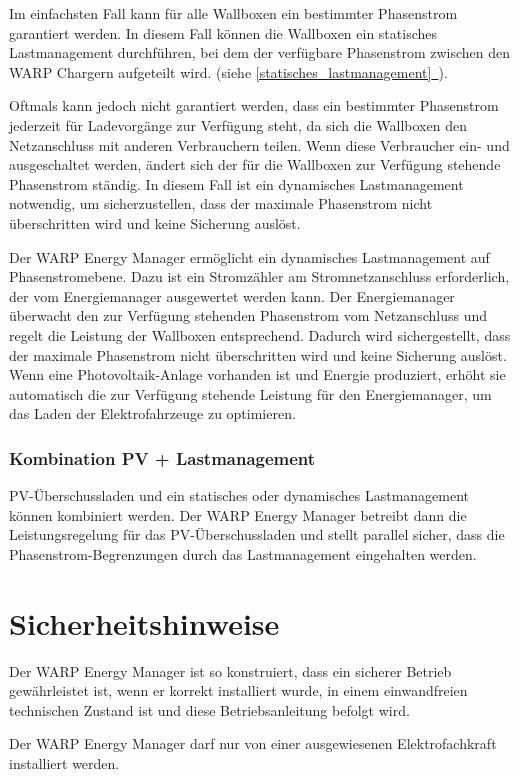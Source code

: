 \documentclass[a4paper,10pt]{article}
\newcommand{\hint}[1]{\begin{tcolorbox}[colback=boxgray,colframe=black,coltext=
white,title=Hinweis,left*=2mm,right*=2mm,boxsep=1mm,bottom=1mm,top=1mm]#1\end{tcolorbox}}
\newcommand*{\fullref}[1]{\hyperref[{#1}]{\ref*{#1}~\nameref*{#1}}}
\begin{document}
\begin{multicols*}{2}
	Im einfachsten Fall kann für alle Wallboxen ein bestimmter Phasenstrom garantiert werden.
	In diesem Fall können die Wallboxen ein statisches Lastmanagement durchführen,
	bei dem der verfügbare Phasenstrom zwischen den WARP Chargern aufgeteilt wird. (siehe \fullref{statisches_lastmanagement}).

	Oftmals kann jedoch nicht garantiert werden, dass ein bestimmter Phasenstrom jederzeit
	für Ladevorgänge zur Verfügung steht, da sich die Wallboxen den Netzanschluss mit anderen Verbrauchern teilen.
	Wenn diese Verbraucher ein- und ausgeschaltet werden,
	ändert sich der für die Wallboxen zur Verfügung stehende Phasenstrom
	ständig. In diesem Fall ist ein dynamisches Lastmanagement notwendig, um
	sicherzustellen, dass der maximale Phasenstrom nicht überschritten wird und
	keine Sicherung auslöst.

	Der WARP Energy Manager ermöglicht ein dynamisches Lastmanagement auf Phasenstromebene.
	Dazu ist ein Stromzähler am Stromnetzanschluss erforderlich, der vom Energiemanager
	ausgewertet werden kann. Der Energiemanager überwacht den zur Verfügung stehenden
	Phasenstrom vom Netzanschluss und regelt die Leistung der Wallboxen entsprechend.
	Dadurch wird sichergestellt, dass der maximale Phasenstrom nicht überschritten wird
	und keine Sicherung auslöst. Wenn eine Photovoltaik-Anlage vorhanden ist und Energie
	produziert, erhöht sie automatisch die zur Verfügung stehende Leistung für den
	Energiemanager, um das Laden der Elektrofahrzeuge zu optimieren.

	\subsubsection{Kombination PV + Lastmanagement}
	PV-Überschussladen und ein statisches oder dynamisches Lastmanagement können
	kombiniert werden. Der WARP Energy Manager betreibt dann die
	Leistungsregelung für das PV-Überschussladen und stellt parallel sicher, dass die
	Phasenstrom-Begrenzungen durch das Lastmanagement eingehalten werden.

	\newpage
	\section{Sicherheitshinweise}
	Der WARP Energy Manager ist so konstruiert, dass ein sicherer Betrieb gewährleistet ist,
	wenn er korrekt installiert wurde, in einem einwandfreien technischen Zustand
	ist und diese Betriebsanleitung befolgt wird. \hint{Der WARP Energy Manager darf nur von einer ausgewiesenen Elektrofachkraft installiert
		werden.}


\end{multicols*}
\end{document}
